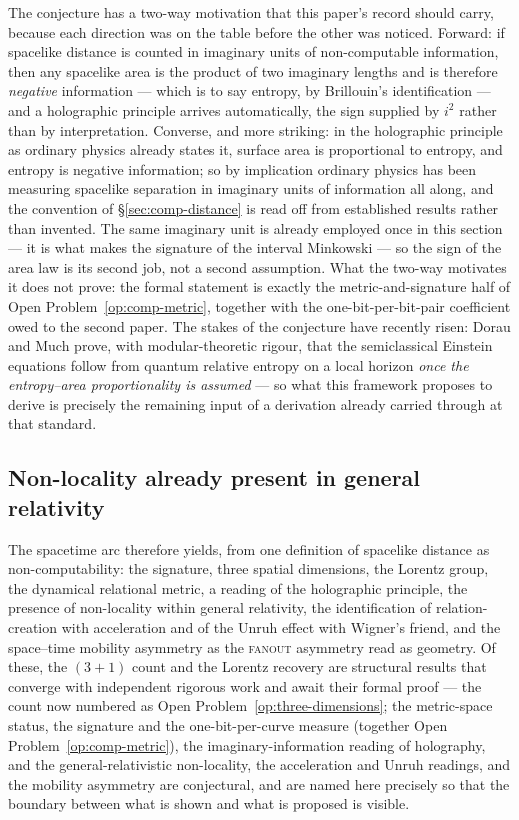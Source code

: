 The conjecture has a two-way motivation that this paper's record should carry, because each
direction was on the table before the other was noticed. Forward: if spacelike distance is counted
in imaginary units of non-computable information, then any spacelike area is the product of two
imaginary lengths and is therefore \emph{negative} information --- which is to say entropy, by
Brillouin's identification \autocite{brillouin1956science} --- and a holographic principle arrives
automatically, the sign supplied by $i^{2}$ rather than by interpretation. Converse, and more
striking: in the holographic principle as ordinary physics already states it, surface area is
proportional to entropy, and entropy is negative information; so by implication ordinary physics
has been measuring spacelike separation in imaginary units of information all along, and the
convention of \S\ref{sec:comp-distance} is read off from established results rather than
invented. The same imaginary unit is already employed once in this section --- it is what makes
the signature of the interval Minkowski --- so the sign of the area law is its second job, not a
second assumption. What the two-way motivates it does not prove: the formal statement is exactly
the metric-and-signature half of Open Problem~\ref{op:comp-metric}, together with the
one-bit-per-bit-pair coefficient owed to the second paper. The stakes of the conjecture have
recently risen: Dorau and Much prove, with modular-theoretic rigour, that the semiclassical
Einstein equations follow from quantum relative entropy on a local horizon \emph{once the
entropy--area proportionality is assumed} \autocite{doraumuch2026relative} --- so what this
framework proposes to derive is precisely the remaining input of a derivation already carried
through at that standard.


\subsection{Non-locality already present in general relativity}
\label{sec:gr-nonlocality}

\medskip
\noindent  The spacetime arc therefore yields, from one definition of spacelike
distance as non-computability: the signature, three spatial dimensions,
the Lorentz group, the dynamical relational metric, a reading of the
holographic principle, the presence of non-locality within general
relativity, the identification of relation-creation with acceleration
and of the Unruh effect with Wigner's friend, and the space--time
mobility asymmetry as the \textsc{fanout} asymmetry read as geometry. Of these,
the $(3+1)$ count and the Lorentz recovery are structural results that converge with independent
rigorous work and await their formal proof --- the count now numbered as
Open Problem~\ref{op:three-dimensions}; the metric-space status, the signature and the
one-bit-per-curve measure (together Open Problem~\ref{op:comp-metric}), the imaginary-information
reading of holography, and the general-relativistic non-locality, the acceleration and
Unruh readings, and the mobility asymmetry are conjectural, and are named here precisely so that the boundary between what is shown and what
is proposed is visible.

